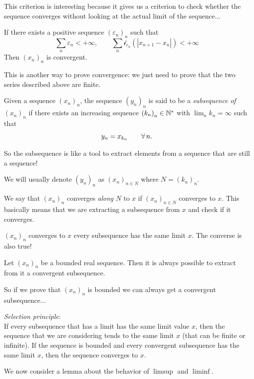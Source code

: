 \documentclass{report}
\begin{document}
This criterion is interesting because it gives us a criterion to check whether the sequence converges without looking at the actual limit of the sequence...
\begin{proposition}
	If there exists a positive sequence ${(\varepsilon_n)}_n$ such that
	\[\sum_n\varepsilon_n<+\infty,\qquad\sum_n\mathcal{i}_{\varepsilon_n}(|x_{n+1}-x_n|)<+\infty\]
	Then ${(x_n)}_{n}$ is convergent.
\end{proposition}
This is another way to prove convergence: we just need to prove that the two series described above are finite.
\begin{definition}
	Given a sequence ${(x_n)}_{n}$, the sequence ${(y_n)}_{n}$ is said to be a \emph{subsequence of ${(x_n)}_{n}$} if there exists an increasing sequence ${(k_n)}_{n}\in\mathbb{N}^{*}$ with $\lim_n k_n=\infty$ such that
	\[y_n=x_{k_n}\qquad\forall\, n.\]
\end{definition}
So the subsequence is like a tool to extract elements from a sequence that are still a sequence!
\begin{notation}
	We will usually denote ${(y_n)}_n$ as ${(x_n)}_{n\in N}$ where $N={(k_n)}_n$.
\end{notation}
\begin{remark}
We say that ${(x_n)}_{n}$ converges \emph{along $N$} to $x$ if ${(x_n)}_{n\in N}$ converges to $x$. This basically means that we are extracting a subsequence from $x$ and check if it converges.
\end{remark}
\begin{remark}
	${(x_n)}_{n}$ converges to $x$ \ifonly{} every subsequence has the same limit $x$. The converse is also true!
\end{remark}
\begin{remark}
	Let ${(x_n)}_{n}$ be a bounded real sequence. Then it is always possible to extract from it a convergent subsequence. 
\end{remark}
So if we prove that ${(x_n)}_{n}$ is bounded we can always get a convergent subsequence...
\begin{proposition}
	\emph{Selection principle}:\\
	If every subsequence that has a limit has the same limit value $x$, then the sequence that we are considering tends to the same limit $x$
(that can be finite or infinite).
If the sequence is bounded and every convergent subsequence has the same limit $x$, then the sequence converges to $x$.
\end{proposition}
We now consider a lemma about the behavior of $\limsup$ and $\liminf$.
\end{document}
